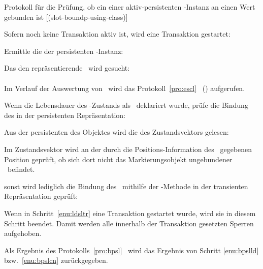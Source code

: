 %
%
\begin{infol}
%
\acaption%
 {{Protokoll f\"{u}r die Pr\"{u}fung, ob ein \protect\Slt\/ einer
   aktiv-persistenten \clos-Instanz an einen Wert gebunden ist}}%
 [(slot-boundp-using-class)]\label{pro:bpsl}%
%
\item\label{enu:bpsltr} Sofern noch keine Transaktion aktiv ist, wird
eine Transaktion gestartet:\\
%
\item Ermittle die \sobjid\/ der persistenten \clos-Instanz:\\
%
\item Das den \Slt\/ repr\"{a}sentierende \sltdo\ wird gesucht:\\
\\
Im Verlauf der Auswertung von
\ wird das
Protokoll~\ref{pro:escl}
\stfn{\enscldescr}\ (\citepage{\pageref{pro:escl}}) aufgerufen.
%
\item Wenn die Lebensdauer des \Slt\/-Zustands als
\ deklariert wurde, pr\"{u}fe die Bindung
des \Slt[s]\/ in der persistenten Repr\"{a}sentation:
%
\begin{block}
%
\item Aus der persistenten \representation{} des Objektes wird die
\sobjid\/ des Zustandsvektors gelesen:\\
%
\item\label{enu:bpslld} Im Zustandsvektor wird an der durch
die Po\-si\-tions-In\-for\-ma\-tion des \sltdo[es]\ gegebenen Position
gepr\"{u}ft, ob sich dort nicht das Markierungsobjekt \rglq{}ungebundener
\Slt\rgrq\ befindet.
%
\end{block}
%
\item\label{enu:bpslcn} sonst wird lediglich die Bindung des \Slt[s]\
mithilfe der \std-Methode in der transienten Repr\"{a}sentation
gepr\"{u}ft:\\
%
\item Wenn in Schritt~\ref{enu:ldsltr} eine Transaktion gestartet
wurde, wird sie in diesem Schritt beendet. Damit werden alle innerhalb
der Transaktion gesetzten Sperren aufgehoben.
%
\item Als Ergebnis des Protokolls~\ref{pro:bpsl}
\ wird das Ergebnis von
Schritt \ref{enu:bpslld} bzw.\ \ref{enu:bpslcn} zur\"{u}ckgegeben.
%
\end{infol}
